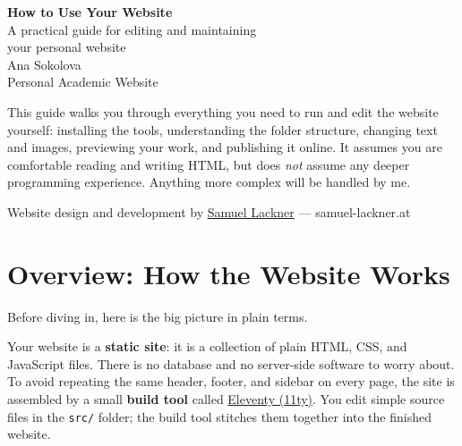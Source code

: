 \documentclass[11pt,a4paper]{article}
\newcommand{\file}[1]{\texttt{#1}}
\begin{document}
\begin{titlepage}
\thispagestyle{empty}
\vspace*{3cm}
\begin{center}
  {\Huge\bfseries\color{accent} How to Use Your Website}\\[0.6cm]
  {\Large A practical guide for editing and maintaining\\ your personal website}\\[1.4cm]
  {\large Ana Sokolova}\\[0.3cm]
  {\color{muted}\large Personal Academic Website}\\[2.4cm]
\end{center}

\begin{center}
\begin{minipage}{0.82\textwidth}
\begin{notebox}
This guide walks you through everything you need to run and edit the
website yourself: installing the tools, understanding the folder
structure, changing text and images, previewing your work, and
publishing it online. It assumes you are comfortable reading and writing
HTML, but does \emph{not} assume any deeper programming experience.
Anything more complex will be handled by me.
\end{notebox}
\end{minipage}
\end{center}

\vfill
\begin{center}
{\color{muted}\small Website design and development by
\href{https://samuel-lackner.at/}{Samuel Lackner} — samuel-lackner.at}
\end{center}
\end{titlepage}

\tableofcontents
\newpage

\section{Overview: How the Website Works}

Before diving in, here is the big picture in plain terms.

Your website is a \textbf{static site}: it is a collection of plain HTML,
CSS, and JavaScript files. There is no database and no server-side
software to worry about. To avoid repeating the same header, footer, and
sidebar on every page, the site is assembled by a small \textbf{build
tool} called \href{https://www.11ty.dev/}{Eleventy (11ty)}. You edit
simple source files in the \file{src/} folder; the build tool stitches
them together into the finished website.
\end{document}
